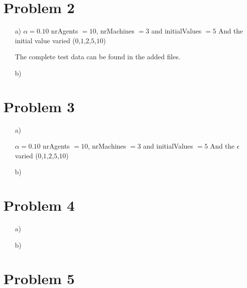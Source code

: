\documentclass[12pt]{article}
\begin{document}
\section*{Problem 2}
\begin{enumerate}
	\item[a)]
	$\alpha = 0.10$
	nrAgents $= 10$, nrMachines $=3$ and initialValues $=5$
	And the initial value varied ($0$,$1$,$2$,$5$,$10$)

	The complete test data can be found in the added files.




	\item[b)]
\end{enumerate}

\section*{Problem 3}

\begin{enumerate}
	\item[a)]


	$\alpha = 0.10$
	nrAgents $= 10$, nrMachines $=3$ and initialValues $=5$
	And the $\epsilon$ varied ($0$,$1$,$2$,$5$,$10$)

	\item[b)]
\end{enumerate}

\section*{Problem 4}

\begin{enumerate}
	\item[a)]
	\item[b)]
\end{enumerate}

\section*{Problem 5}
\end{document}
